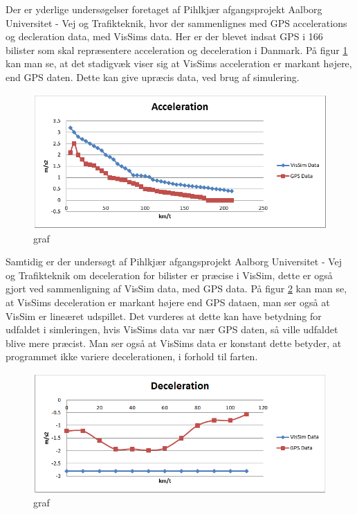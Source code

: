 Der er yderlige undersøgelser foretaget af Pihlkjær afgangsprojekt Aalborg Universitet - Vej og Trafikteknik, hvor der sammenlignes med GPS accelerations og decleration data, med VisSims data. Her er der blevet indsat GPS i 166 bilister som skal repræsentere acceleration og deceleration i Danmark. På figur \ref{GrafForAccelerationVisSimGPS} kan man se, at det stadigvæk viser sig at VisSims acceleration er markant højere, end GPS daten. Dette kan give upræcis data, ved brug af simulering. 

\begin{figure}
\begin{center}
\includegraphics[width=1.0\textwidth]{Pictures/Teknologianalyse/GrafForAccelerationVisSimGPS.png}
\end{center}
\label{GrafForAccelerationVisSimGPS}
\caption{graf}
\end{figure}

Samtidig er der undersøgt af Pihlkjær afgangsprojekt Aalborg Universitet - Vej og Trafikteknik om deceleration for bilister er præcise i VisSim, dette er også gjort ved sammenligning af VisSim data, med GPS data. På figur \ref{GrafForDecelerationVisSimGPS} kan man se, at VisSims deceleration er markant højere end GPS dataen, man ser også at VisSim er lineæret udspillet. Det vurderes at dette kan have betydning for udfaldet i simleringen, hvis VisSims data var nær GPS daten, så ville udfaldet blive mere præcist. Man ser også at VisSims data er konstant dette betyder, at programmet ikke variere decelerationen, i forhold til farten. 

\begin{figure}
\begin{center}
\includegraphics[width=1.0\textwidth]{Pictures/Teknologianalyse/GrafForDecelerationVisSimGPS.png}
\end{center}
\label{GrafForDecelerationVisSimGPS}
\caption{graf}
\end{figure}


